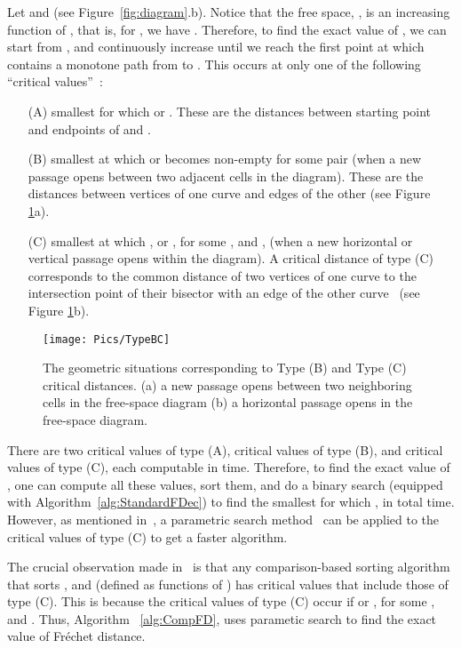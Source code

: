 \documentclass[12pt]{dalthesis}
\newcommand{\Frechet}{Fr\'echet }
\begin{document}
Let  and   (see Figure~\ref{fig:diagram}.b). 
Notice that the free space, , is an increasing function of , 
that is, for , we have .
Therefore, to find the exact value of ,
we can start from , and continuously increase  until
we reach the first point at which  contains a monotone path from  to .
This occurs at only one of the following ``critical values''~\cite{AltG95}:
\begin{itemize} \itemsep1pt
	\item[(A)] smallest  for which  or . 
	These are the distances between starting point and endpoints of  and .
	
	
	\item[(B)] smallest  at which  or   becomes non-empty for some
 	pair  (when a new passage opens between two adjacent cells in the diagram). 
	These are the distances between vertices of one curve and edges of the other (see Figure \ref{fig:TypeBC}a).
	
	\item[(C)] smallest  at which , or 
	, for some , and , 
	(when a new horizontal or vertical passage opens within the diagram). 
	A critical distance of type (C) corresponds to the common 
	distance of two vertices of one curve 
	to the intersection point of their bisector 
	with an edge of the other curve~\cite{AltG95} (see Figure \ref{fig:TypeBC}b).
\end{itemize}



\begin{figure}[t]
	\centering
	\texttt{[image: Pics/TypeBC]}
	\caption{The geometric situations corresponding to Type (B) and Type (C)
 critical distances. 
(a) a new passage opens between two neighboring cells in the free-space diagram (b) a horizontal passage opens in the free-space diagram. }
	\label{fig:TypeBC}
\end{figure}

There are two critical values of type (A), 
 critical values of type (B), and  critical values of type (C),
each computable in  time.
Therefore, to find the exact value of ,
one can compute all these  values, sort them, 
and do a binary search (equipped with Algorithm~\ref{alg:StandardFDec})
to find the smallest  for which ,
in  total time.
However, as mentioned in~\cite{AltG95},
a parametric search method~\cite{Megiddo83,Cole87} can be applied
to the critical values of type (C) to get a faster algorithm.

The crucial observation made in~\cite{AltG95} is that
any comparison-based sorting algorithm that sorts
, and  (defined as functions of )
has critical values that include those of type (C).
This is because the critical values of type (C) occur if 
 or , 
for some , and . Thus, Algorithm ~\ref{alg:CompFD}, 
uses parametic search to find the exact value of \Frechet distance.
\end{document}
